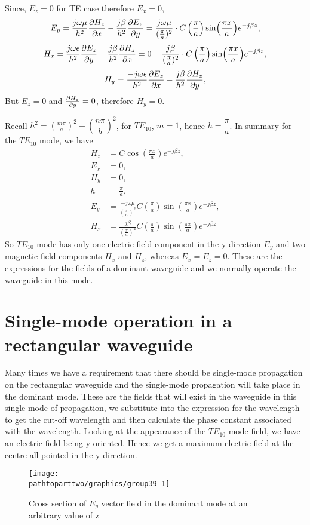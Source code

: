Since, $E_z = 0$ for TE case therefore $E_x = 0$,
\begin{dmath*}
E_y = \frac{j\omega\mu}{h^2}\pdv{ H_z}{x} - \frac{j\beta}{h^2}\pdv{E_z}{y} = \frac{j\omega\mu}{(\frac{\pi}{a})^2} \cdot C\left(\frac{\pi}{a}\right)\sin(\frac{\pi x}{a})e^{-j\beta z},
\end{dmath*} 
\begin{dmath*}
H_x = \frac{j\omega\epsilon}{h^2}\pdv{E_z}{y} - \frac{j\beta}{h^2}\pdv{H_z}{x}= 0 - \frac{j\beta}{(\frac{\pi}{a})^2} \cdot C\left(\frac{\pi}{a}\right)\sin(\frac{\pi x}{a})e^{-j\beta z},
\end{dmath*}
\begin{dmath*}
H_y = \frac{-j\omega\epsilon}{h^2}\pdv{E_z}{x} -  \frac{j\beta}{h^2}\pdv{H_z}{y}, 
\end{dmath*}
But $E_z = 0$ and $\pdv{H_z}{y} = 0$, therefore $H_y = 0$. 

Recall $h^2 =\left(\frac{m\pi}{a}\right)^2 + \left(\dfrac{n\pi}{b}\right)^2$,  for $TE_{10}$, $m = 1$, hence $h = \dfrac{\pi}{a}$. In summary for the $TE_{10}$ mode, we have 
\begin{align}
H_z &= C\cos(\frac{\pi x}{a})e^{-j\beta z},\\
E_x &= 0,\\
H_y &= 0,\\
h &= \frac{\pi}{a},\\
E_y &=\frac{-j\omega\mu }{(\frac{\pi}{a})^2}C\left(\frac{\pi}{a}\right)\sin(\frac{\pi x}{a})e^{-j\beta z},\\ 
H_x &= \frac{j\beta}{(\frac{\pi}{a})^2}C\left(\frac{\pi}{a}\right)\sin(\frac{\pi x}{a})e^{-j\beta z} 
\end{align}
So $TE_{10}$ mode has only one electric field component in the y-direction $E_y$ and two magnetic field components $H_x$ and $H_z$, whereas $E_x = E_z = 0$. These are the expressions for the fields of a dominant waveguide and we normally operate the waveguide in this mode.

\section{Single-mode operation in a rectangular waveguide}
 Many times we have a requirement that there should be single-mode propagation on the rectangular waveguide and the single-mode propagation will take place in the dominant mode. These are the fields that will exist in the waveguide in this single mode of propagation, we substitute into the expression for the wavelength to get the cut-off wavelength and then calculate the phase constant associated with the wavelength. Looking at the appearance of the $TE_{10}$ mode field, we have an electric field being y-oriented. Hence we get a maximum electric field at the centre all pointed in the y-direction.
\begin{figure}[h]
\centering
\texttt{[image: \\pathtoparttwo/graphics/group39-1]}
\caption{Cross section of $E_y$ vector field in the dominant mode at an arbitrary value of z}
\label{fig:lec39-1}
\end{figure}

